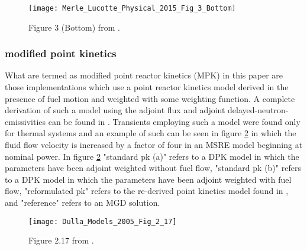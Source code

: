 \documentclass[review]{elsarticle}
\begin{document}
\begin{figure}[h]
   \centering
   \texttt{[image: Merle\_Lucotte\_Physical\_2015\_Fig\_3\_Bottom]}
   \caption{Figure 3 (Bottom) from \cite{merle-lucotte_physical_2015}.} 
   \label{fig:lucotte_ipk}
\end{figure}

\subsubsection{modified point kinetics} \label{sssec:mpk}
What are termed as
modified point reactor kinetics (MPK) in this paper are those implementations
which use a point reactor kinetics model derived in the presence of fuel motion
and weighted with some weighting function. A complete derivation of such a
model using the adjoint flux and adjoint delayed-neutron-emissivities can be
found in \cite{dulla_models_2005}. Transients employing such a model were found
only for thermal systems and an example of such can be seen in figure 
\ref{fig:dulla_4x_flow} in which the fluid flow velocity is increased by a factor
of four in an MSRE model beginning at nominal power.
In figure \ref{fig:dulla_4x_flow} "standard pk (a)" refers
to a DPK model in which the parameters have been adjoint weighted without fuel
flow, "standard pk (b)" refers to a DPK model in which the parameters have
been adjoint weighted with fuel flow, "reformulated pk" refers to the re-derived
point kinetics model found in \cite{dulla_models_2005}, and "reference" refers
to an MGD solution.

\begin{figure}[h]
   \centering
   \texttt{[image: Dulla\_Models\_2005\_Fig\_2\_17]}
   \caption{Figure 2.17 from \cite{dulla_models_2005}.} 
   \label{fig:dulla_4x_flow}
\end{figure}
\end{document}
